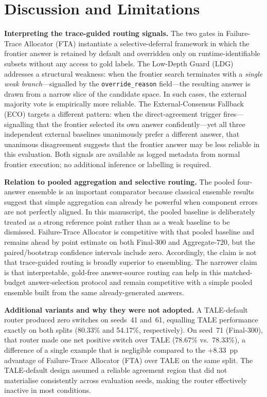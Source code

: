 \section{Discussion and Limitations}
\label{sec:discussion}

\medskip\noindent\textbf{Interpreting the trace-guided routing signals.}
The two gates in Failure-Trace Allocator (FTA) instantiate a selective-deferral
framework in which the frontier answer is retained by default and overridden only
on runtime-identifiable subsets without any access to gold labels.
The Low-Depth Guard (LDG) addresses a structural weakness: when the frontier search
terminates with a \textit{single weak branch}---signalled by the \texttt{override\_reason}
field---the resulting answer is drawn from a narrow slice of the candidate space.
In such cases, the external majority vote is empirically more reliable.
The External-Consensus Fallback (ECO) targets a different pattern: when the
direct-agreement trigger fires---signalling that the frontier selected its own answer
confidently---yet all three independent external baselines unanimously prefer a different
answer, that unanimous disagreement suggests that the frontier answer may be less reliable in this evaluation.
Both signals are available as logged metadata from normal frontier execution;
no additional inference or labelling is required.

\medskip\noindent\textbf{Relation to pooled aggregation and selective routing.}
The pooled four-answer ensemble is an important comparator because classical ensemble results suggest that simple aggregation can already be powerful when component errors are not perfectly aligned.
In this manuscript, the pooled baseline is deliberately treated as a strong reference point rather than as a weak baseline to be dismissed.
Failure-Trace Allocator is competitive with that pooled baseline and remains ahead by point estimate on both Final-300 and Aggregate-720, but the paired/bootstrap confidence intervals include zero.
Accordingly, the claim is not that trace-guided routing is broadly superior to ensembling.
The narrower claim is that interpretable, gold-free answer-source routing can
help in this matched-budget answer-selection protocol and remain competitive with
a simple pooled ensemble built from the same already-generated answers.

\medskip\noindent\textbf{Additional variants and why they were not adopted.}
A TALE-default router produced zero switches on seeds~41 and~61,
equalling TALE performance exactly on both splits (80.33\% and 54.17\%,
respectively).
On seed~71 (Final-300), that router made one net positive switch over TALE
(78.67\% vs.\ 78.33\%), a difference of a single example that is negligible
compared to the $+8.33$~pp advantage of Failure-Trace Allocator (FTA) over TALE on the same split.
The TALE-default design assumed a reliable agreement region that did not materialise
consistently across evaluation seeds, making the router effectively inactive in most
conditions.

